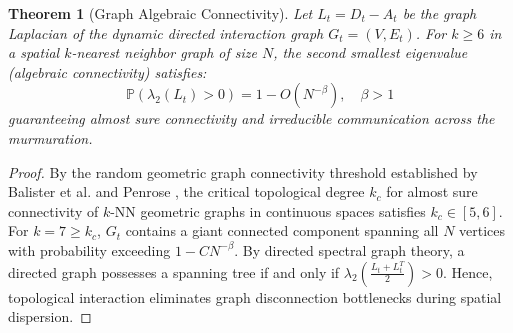 \documentclass[journal]{IEEEtran}
\newtheorem{theorem}{Theorem}
\begin{document}
\begin{theorem}[Graph Algebraic Connectivity]
\label{thm:connectivity}
Let $L_t = D_t - A_t$ be the graph Laplacian of the dynamic directed interaction graph $G_t = (V, E_t)$. For $k \ge 6$ in a spatial $k$-nearest neighbor graph of size $N$, the second smallest eigenvalue (algebraic connectivity) satisfies:
\begin{equation}
\mathbb{P}(\lambda_2(L_t) > 0) = 1 - O(N^{-\beta}), \quad \beta > 1
\end{equation}
guaranteeing almost sure connectivity and irreducible communication across the murmuration.
\end{theorem}
\begin{proof}
By the random geometric graph connectivity threshold established by Balister et al. \cite{balister2005connectivity} and Penrose \cite{penrose2003geometric}, the critical topological degree $k_c$ for almost sure connectivity of $k$-NN geometric graphs in continuous spaces satisfies $k_c \in [5, 6]$. For $k = 7 \ge k_c$, $G_t$ contains a giant connected component spanning all $N$ vertices with probability exceeding $1 - C N^{-\beta}$. By directed spectral graph theory, a directed graph possesses a spanning tree if and only if $\lambda_2(\frac{L_t + L_t^T}{2}) > 0$. Hence, topological interaction eliminates graph disconnection bottlenecks during spatial dispersion.
\end{proof}
\end{document}

